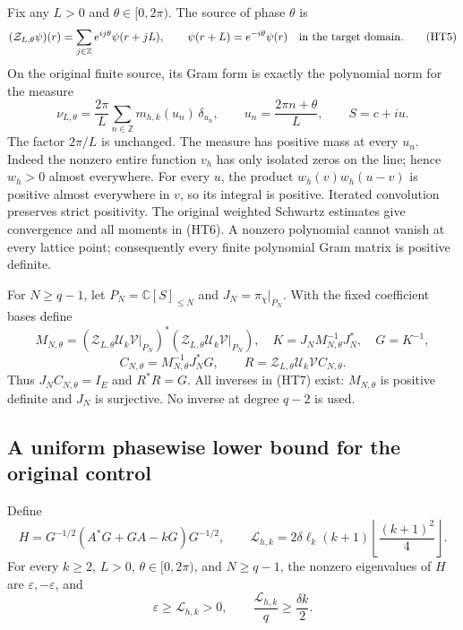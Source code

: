 Fix any $L>0$ and $\theta\in[0,2\pi)$.  The source of phase $\theta$ is
\[
 (\mathcal Z_{L,\theta}\psi)(r)=
 \sum_{j\in\mathbb Z}e^{ij\theta}\psi(r+jL),\qquad
 \psi(r+L)=e^{-i\theta}\psi(r)
 \quad\hbox{in the target domain}.
 \tag{HT5}
\]
On the original finite source, its Gram form is exactly the polynomial
norm for the measure
\[
 \nu_{L,\theta}=
 \frac{2\pi}{L}\sum_{n\in\mathbb Z}m_{h,k}(u_n)\,\delta_{u_n},
 \qquad u_n=\frac{2\pi n+\theta}{L},\qquad S=c+iu.
 \tag{HT6}
\]
The factor $2\pi/L$ is unchanged.  The measure has positive mass at every
$u_n$.  Indeed the nonzero entire function $v_h$ has only isolated zeros
on the line; hence $w_h>0$ almost everywhere.  For every $u$, the product
$w_h(v)w_h(u-v)$ is positive almost everywhere in $v$, so its integral is
positive.  Iterated convolution preserves strict positivity.  The
original weighted Schwartz estimates give convergence and all moments
in (HT6).  A nonzero polynomial cannot vanish at every lattice point;
consequently every finite polynomial Gram matrix is positive definite.

For $N\geq q-1$, let $P_N=\mathbb C[S]_{\leq N}$ and
$J_N=\pi_\chi|_{P_N}$.  With the fixed coefficient bases define
\[
 M_{N,\theta}=(\mathcal Z_{L,\theta}\mathcal U_k\mathcal V|_{P_N})^*
 (\mathcal Z_{L,\theta}\mathcal U_k\mathcal V|_{P_N}),\quad
 K=J_NM_{N,\theta}^{-1}J_N^*,\quad G=K^{-1},
\]
\[
 C_{N,\theta}=M_{N,\theta}^{-1}J_N^*G,\qquad
 R=\mathcal Z_{L,\theta}\mathcal U_k\mathcal V C_{N,\theta}.
 \tag{HT7}
\]
Thus $J_NC_{N,\theta}=I_E$ and $R^*R=G$.  All inverses in (HT7)
exist: $M_{N,\theta}$ is positive definite and $J_N$ is surjective.
No inverse at degree $q-2$ is used.

\subsection{A uniform phasewise lower bound for the original control}

Define
\[
 H=G^{-1/2}(A^*G+GA-kG)G^{-1/2},\qquad
 \mathcal L_{h,k}=2\delta\ell_k(k+1)
 \left\lfloor\frac{(k+1)^2}{4}\right\rfloor.
 \tag{HT8}
\]
For every $k\geq2$, $L>0$, $\theta\in[0,2\pi)$, and $N\geq q-1$,
the nonzero eigenvalues of $H$ are $\varepsilon,-\varepsilon$, and
\[
 \boxed{\varepsilon\geq\mathcal L_{h,k}>0,
 \qquad \frac{\mathcal L_{h,k}}q\geq\frac{\delta k}{2}.}
 \tag{HT9}
\]

